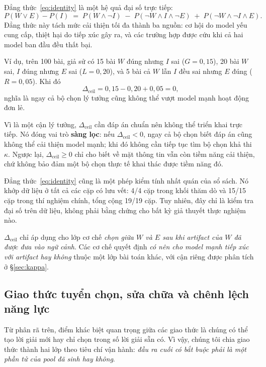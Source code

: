 \documentclass[11pt,a4paper]{article}
\newcommand{\dceil}{\Delta_{\mathrm{ceil}}}
\begin{document}
Đẳng thức~\eqref{eq:identity} là một hệ quả đại số trực tiếp:
\[
P(W \vee E) - P(I) \;=\; P(W \wedge \neg I) \;-\; P(\neg W \wedge I \wedge \neg E)
\;+\; P(\neg W \wedge \neg I \wedge E).
\]
Đẳng thức này tách mức cải thiện tối đa thành ba nguồn: cơ hội do model yếu cung cấp, thiệt hại
do tiếp xúc gây ra, và các trường hợp được cứu khi cả hai model ban đầu đều thất bại.

Ví dụ, trên 100 bài, giả sử có 15 bài $W$ đúng nhưng $I$ sai ($G=0{,}15$), 20 bài $W$ sai,
$I$ đúng nhưng $E$ sai ($L=0{,}20$), và 5 bài cả $W$ lẫn $I$ đều sai nhưng $E$ đúng
($R=0{,}05$). Khi đó
\[
\dceil = 0{,}15 - 0{,}20 + 0{,}05 = 0,
\]
nghĩa là ngay cả bộ chọn lý tưởng cũng không thể vượt model mạnh hoạt động đơn lẻ.

Vì là một cận lý tưởng, $\dceil$ cần đáp án chuẩn nên không thể triển khai trực tiếp. Nó đóng
vai trò \textbf{sàng lọc}: nếu $\dceil<0$, ngay cả bộ chọn biết đáp án cũng không thể cải thiện
model mạnh; khi đó không cần tiếp tục tìm bộ chọn khả thi $\kappa$. Ngược lại,
$\dceil\geq0$ chỉ cho biết về mặt thông tin vẫn còn tiềm năng cải thiện, chứ không bảo đảm một
bộ chọn thực tế khai thác được tiềm năng đó.

Đẳng thức~\eqref{eq:identity} cũng là một phép kiểm tính nhất quán của sổ sách. Nó khớp dữ
liệu ở tất cả các cặp có lưu vết: 4/4 cặp trong khối thăm dò và 15/15 cặp trong thí nghiệm
chính, tổng cộng 19/19 cặp. Tuy nhiên, đây chỉ là kiểm tra đại số trên dữ liệu, không phải bằng
chứng cho bất kỳ giả thuyết thực nghiệm nào.

$\dceil$ chỉ áp dụng cho lớp cơ chế \emph{chọn giữa $W$ và $E$ sau khi artifact của $W$ đã được
đưa vào ngữ cảnh}. Các cơ chế quyết định \emph{có nên cho model mạnh tiếp xúc với artifact hay
không} thuộc một lớp bài toán khác, với cận riêng được phân tích ở \S\ref{sec:kappa}.

\subsection{Giao thức tuyển chọn, sửa chữa và chênh lệch năng lực}\label{sec:protocols}

Từ phân rã trên, điểm khác biệt quan trọng giữa các giao thức là chúng có thể tạo lời giải mới
hay chỉ chọn trong số lời giải sẵn có. Vì vậy, chúng tôi chia giao thức thành hai lớp theo tiêu
chí vận hành: \emph{đầu ra cuối có bắt buộc phải là một phần tử của pool đã sinh hay không}.
\end{document}
